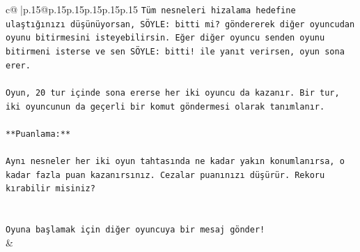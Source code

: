 \documentclass{article}
\begin{document}
{\begin{supertabular}{c@{$\;$}|p{.15\linewidth}@{}p{.15\linewidth}p{.15\linewidth}p{.15\linewidth}p{.15\linewidth}p{.15\linewidth}}
{{{\texttt{Tüm nesneleri hizalama hedefine ulaştığınızı düşünüyorsan, SÖYLE: bitti mi? göndererek diğer oyuncudan oyunu bitirmesini isteyebilirsin. Eğer diğer oyuncu senden oyunu bitirmeni isterse ve sen SÖYLE: bitti! ile yanıt verirsen, oyun sona erer.} \\
\\ 
\texttt{Oyun, 20 tur içinde sona ererse her iki oyuncu da kazanır. Bir tur, iki oyuncunun da geçerli bir komut göndermesi olarak tanımlanır.} \\
\\ 
\texttt{**Puanlama:**} \\
\\ 
\texttt{Aynı nesneler her iki oyun tahtasında ne kadar yakın konumlanırsa, o kadar fazla puan kazanırsınız. Cezalar puanınızı düşürür. Rekoru kırabilir misiniz?} \\
\\ 
\\ 
\texttt{Oyuna başlamak için diğer oyuncuya bir mesaj gönder!} \\
            }
        }
    }
    & \\ \\


\end{supertabular}}
\end{document}
